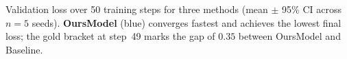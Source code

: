 \caption{Validation loss over 50 training steps for three methods (mean $\pm$ 95\% CI across $n{=}5$ seeds). \textbf{OursModel} (blue) converges fastest and achieves the lowest final loss; the gold bracket at step~49 marks the gap of $\mathbf{0.35}$ between OursModel and Baseline.}
